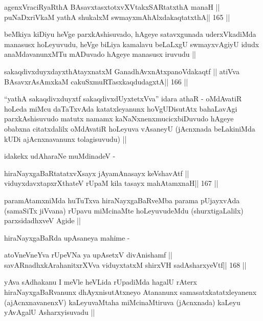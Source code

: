 \begin{shl}
agenxVraciRyaRthA BAsavxtasxtotxvXVtakxSARtatxthA manaH ||
puNaDxriVkaM yathA shukalxM swmayxmAhAlxdakaqtatxthA\hfill || 165 ||
\end{shl}

\begin{artha}
beMkiya kiDiyu heVge parxkAshisuvado, hAgeye satavxgunada
uderxVkadiMda manasusx hoLeyuvudu, heVge biLiya kamalavu beLaLxgU
swmayxvAgiyU idudx anaMdavanunxMTu mADuvado hAgeye manasusx iruvudu ||
\end{artha}

\begin{shl}
sakaqdivxduyxdayxthA\s tayxnatxM GanadhAvxnAtxpanoVdakaqtf ||
atiVva BAsavxrA\s sAmxkaM cakuSxmuRTasxkaqdudagxtA\hfill || 166 ||
\end{shl}

\begin{artha}
``yathA sakaqdivxduyxtf sakaqdivxdUyxtetxVva'' idara athaR -
oMdAvatiR hoLeda miMcu daTaTxvAda katatxleyanunx hoVgUDisutAtx
bahaLavAgi parxkAshisuvudo matutx namamx kaNaNxnenxmucicxbiDuvudo
hAgeye obabxna citatxdalilx oMdAvatiR hoLeyuva vAsaneyU (jAcnxnada
beLakiniMda kUDi ajAcnxnavanunx tolagisuvudu) ||

idakekx udAharaNe muMdinadeV -
\end{artha}

\begin{shl}
hiraNayxgaBaRtatatxvXsayx jAyamAnasayx keVshavAtf ||
viduyxdavxtapxrXthateV rUpaM kila tasayx mahAtamxnaH\hfill || 167 ||
\end{shl}

\begin{artha}
paramAtamxniMda huTuTxva hiraNayxgaBaRveMba parama pUjayxvAda
(samaSiTx jiVvana) rUpavu miMcinaMte hoLeyuvudeMdu (shurxtigaLalilx)
parxsidadhxveV Agide ||

hiraNayxgaBaRda upAsaneya mahime -
\end{artha}

\begin{shl}
atoV\s neVneYva rUpeVNa ya upAsetxV divAnishamf ||
savARnadhxkArahanitxrXVva viduyxtatxM shirxVH sadA\s\s sharxyeVtf\hfill || 168 ||
\end{shl}

\begin{artha}
yAva sAdhakanu I meVle heVLida rUpadiMda hagalU rAterx
hiraNayxgaBaRvanunx dhAyxnisutAtxneyo Atananunx samasatxkatatxleyanenx
(ajAcnxnavanenxV) kaLeyuvaMtaha miMcinaMtiruva (jAcnxnada) kaLeyu
yAvAgalU Asharxyisuvadu ||
\end{artha}

